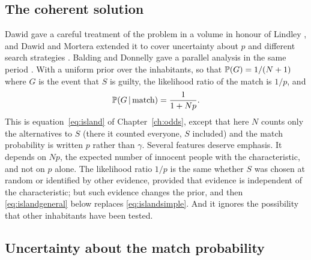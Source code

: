 \subsection{The coherent solution}

Dawid gave a careful treatment of the problem in a volume in honour of Lindley \citep{dawid1994}, and Dawid and Mortera extended it to cover uncertainty about $p$ and different search strategies \citep{dawid1996}. Balding and Donnelly gave a parallel analysis in the same period \citep{balding1995}. With a uniform prior over the inhabitants, so that $\mathbb{P}(G) = 1/(N+1)$ where $G$ is the event that $S$ is guilty, the likelihood ratio of the match is $1/p$, and
\begin{equation}
\mathbb{P}(G\,\vert\, \text{match}) = \frac{1}{1 + Np}.
\label{eq:islandsimple}
\end{equation}
This is equation~\eqref{eq:island} of Chapter~\ref{ch:odds}, except that here $N$ counts only the alternatives to $S$ (there it counted everyone, $S$ included) and the match probability is written $p$ rather than $\gamma$. Several features deserve emphasis. It depends on $N p$, the expected number of innocent people with the characteristic, and not on $p$ alone. The likelihood ratio $1/p$ is the same whether $S$ was chosen at random or identified by other evidence, provided that evidence is independent of the characteristic; but such evidence changes the prior, and then \eqref{eq:islandgeneral} below replaces \eqref{eq:islandsimple}. And it ignores the possibility that other inhabitants have been tested.

\subsection{Uncertainty about the match probability}

